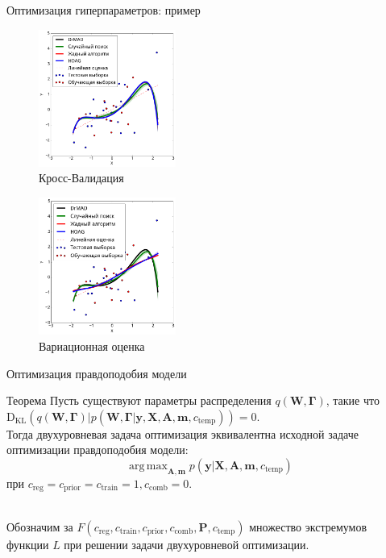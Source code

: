 \documentclass[usenames,dvipsnames,11pt,pdf,utf8,russian,aspectratio=169]{beamer}
\DeclareMathOperator*{\argmax}{arg\,max}
\begin{document}
\begin{frame}{Оптимизация гиперпараметров: пример}
\begin{multicols}{2}
\begin{figure}[h]
\includegraphics[width=0.4\textwidth]{./slide_plots/poly_cv.png}
\caption*{Кросс-Валидация}
\end{figure}

\begin{figure}[h]
\includegraphics[width=0.4\textwidth]{./slide_plots/poly_var.png}
\caption*{Вариационная оценка}
\end{figure}
\end{multicols}

\end{frame}
\begin{frame}{Оптимизация правдоподобия модели}
\begin{block}{Теорема}
Пусть существуют параметры распределения $q(\mathbf{W}, \boldsymbol{\Gamma})$, такие что $\text{D}_\text{KL}(q(\mathbf{W}, \boldsymbol{\Gamma})|p(\mathbf{W},  \boldsymbol{\Gamma}| \mathbf{y}, \mathbf{X}, \mathbf{A}, \mathbf{m}, c_\text{temp})) = 0$.\\
Тогда двухуровневая задача оптимизация эквивалентна исходной задаче оптимизации правдоподобия модели:
$$\argmax_{\mathbf{A}, \mathbf{m}}  p(\mathbf{y}|\mathbf{X},\mathbf{A},\mathbf{m}, c_{\text{temp}})$$ 
при $c_{\text{reg}} = c_{\text{prior}} = c_{\text{train}} = 1, c_{\text{comb}} = 0$. 
\end{block}
~\\
Обозначим за $F(c_{\text{reg}}, c_{\text{train}}, c_{\text{prior}}, c_{\text{comb}}, \mathbf{P}, c_{\text{temp}})$ множество экстремумов функции $L$ при решении задачи двухуровневой оптимизации.
\end{frame}
\end{document}
